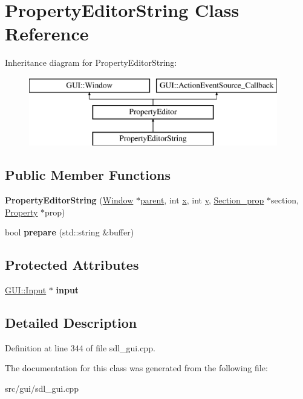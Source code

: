 \hypertarget{classPropertyEditorString}{\section{Property\-Editor\-String Class Reference}
\label{classPropertyEditorString}
}
Inheritance diagram for Property\-Editor\-String\-:\begin{figure}[H]
\begin{center}
\leavevmode
\includegraphics[height=3.000000cm]{classPropertyEditorString}
\end{center}
\end{figure}
\subsection*{Public Member Functions}
\begin{DoxyCompactItemize}
\item 
\hypertarget{classPropertyEditorString_a31b0d946bf3f3266c7c99db8c74e72c2}{{\bfseries Property\-Editor\-String} (\hyperlink{classGUI_1_1Window_ae828e9daa964dfc65a3550fb03117d30}{Window} $\ast$\hyperlink{classGUI_1_1Window_a2e593ff65e7702178d82fe9010a0b539}{parent}, int \hyperlink{classGUI_1_1Window_a6ca6a80ca00c9e1d8ceea8d3d99a657d}{x}, int \hyperlink{classGUI_1_1Window_a0ee8e923aff2c3661fc2e17656d37adf}{y}, \hyperlink{classSection__prop}{Section\-\_\-prop} $\ast$section, \hyperlink{classProperty}{Property} $\ast$prop)}\label{classPropertyEditorString_a31b0d946bf3f3266c7c99db8c74e72c2}

\item 
\hypertarget{classPropertyEditorString_a4653327f5d42f8b8146ecad5d1c9a53e}{bool {\bfseries prepare} (std\-::string \&buffer)}\label{classPropertyEditorString_a4653327f5d42f8b8146ecad5d1c9a53e}

\end{DoxyCompactItemize}
\subsection*{Protected Attributes}
\begin{DoxyCompactItemize}
\item 
\hypertarget{classPropertyEditorString_a01df4231c719d774740cc9dcb24682d5}{\hyperlink{classGUI_1_1Input}{G\-U\-I\-::\-Input} $\ast$ {\bfseries input}}\label{classPropertyEditorString_a01df4231c719d774740cc9dcb24682d5}

\end{DoxyCompactItemize}


\subsection{Detailed Description}


Definition at line 344 of file sdl\-\_\-gui.\-cpp.



The documentation for this class was generated from the following file\-:\begin{DoxyCompactItemize}
\item 
src/gui/sdl\-\_\-gui.\-cpp\end{DoxyCompactItemize}
